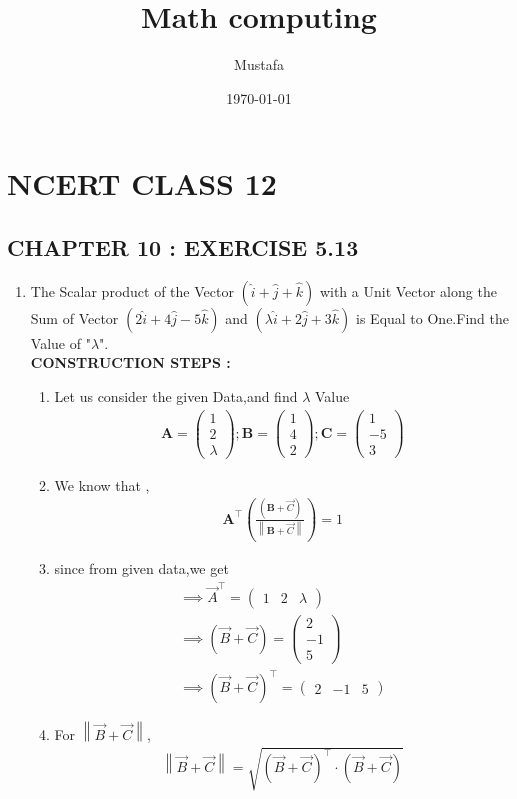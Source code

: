 \documentclass[11pt, a4paper]{article}
\title{ Math computing}
\author{ Mustafa}
\date{\today}
\newcommand{\myvec}[1]{\ensuremath{\begin{pmatrix}#1\end{pmatrix}}}
\let\vec\mathbf
\providecommand{\brak}[1]{\ensuremath{\left(#1\right)}}
\providecommand{\norm}[1]{\left\lVert#1\right\rVert}
\begin{document}
\section*{NCERT CLASS 12}
\subsection*{CHAPTER 10 : EXERCISE 5.13}
\begin{enumerate}
\item The Scalar product of the Vector $(\hat{i}+\hat{j}+\hat{k})$ with a Unit Vector along the Sum of Vector $(2\hat{i}+4\hat{j}-5\hat{k})$ and $(\lambda \hat{i}+2\hat{j}+3\hat{k})$ is Equal to One.Find the Value of "$\lambda$". 
\\

\textbf{CONSTRUCTION STEPS :}
\begin{enumerate}
    \item Let us consider the given Data,and find $\lambda$ Value
    \begin{align}
        \vec{A}=\myvec{1\\2\\ \lambda};\vec{B}=\myvec{1\\4\\2};\vec{C}=\myvec{1\\-5\\3}
    \end{align}
       \item We know that ,\\
       \begin{align}
           \vec{A}^{\top}\brak{\frac{\brak{\vec{B}+\Vec{C}}}{\norm {\vec{B}+\Vec{C}}}}=1\label{eq:Eqt1}
       \end{align}
       \item since from given data,we get
   \begin{align}
    \implies  \Vec{A}^{\top}=\myvec{1&2&\lambda}\\
            \implies   \brak {\Vec{B}+\Vec{C}}=\myvec{2\\-1\\5}\\
          \implies  \brak{\Vec{B}+\Vec{C}}^{\top}=\myvec{2&-1&5}
          \end{align}
          \item For $\norm{\Vec{B}+\Vec{C}}$,
          \begin{align}
              \norm{\Vec{B}+\Vec{C}}=\sqrt{\brak{\Vec{B}+\Vec{C}}^{\top}\cdot\brak{\Vec{B}+\Vec{C}}}\\

\end{align}
\end{enumerate}
\end{enumerate}
\end{document}
